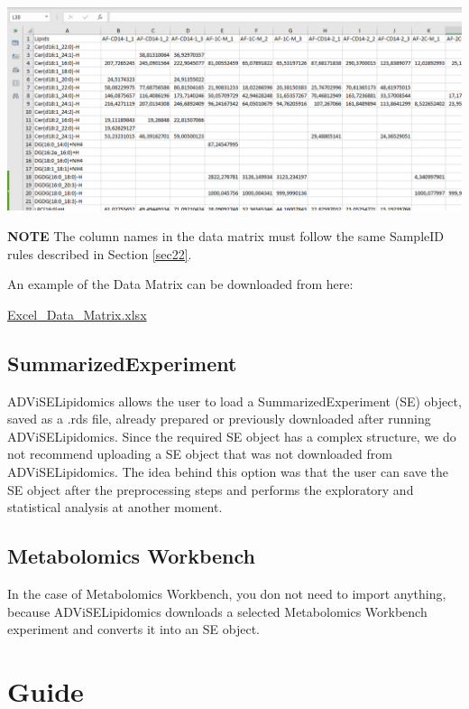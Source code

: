 \documentclass[
]{book}
\begin{document}
\includegraphics[width=1\linewidth]{images/excel_file_example}

\textbf{NOTE}
The column names in the data matrix must follow the same SampleID rules described in Section \ref{sec22}.

An example of the Data Matrix can be downloaded from here:

\href{https://github.com/ShinyFabio/ADViSELipidomics_book/raw/main/data_example/Excel_Data_Matrix.xlsx}{Excel\_Data\_Matrix.xlsx}

\hypertarget{sec26}{%
\section{SummarizedExperiment}\label{sec26}}

ADViSELipidomics allows the user to load a SummarizedExperiment (SE) object, saved as a .rds file, already prepared or previously downloaded after running ADViSELipidomics. Since the required SE object has a complex structure, we do not recommend uploading a SE object that was not downloaded from ADViSELipidomics. The idea behind this option was that the user can save the SE object after the preprocessing steps and performs the exploratory and statistical analysis at another moment.

\hypertarget{sec27}{%
\section{Metabolomics Workbench}\label{sec27}}

In the case of Metabolomics Workbench, you don not need to import anything, because ADViSELipidomics downloads a selected Metabolomics Workbench experiment and converts it into an SE object.

\hypertarget{guide}{%
\chapter{Guide}\label{guide}}
\end{document}
